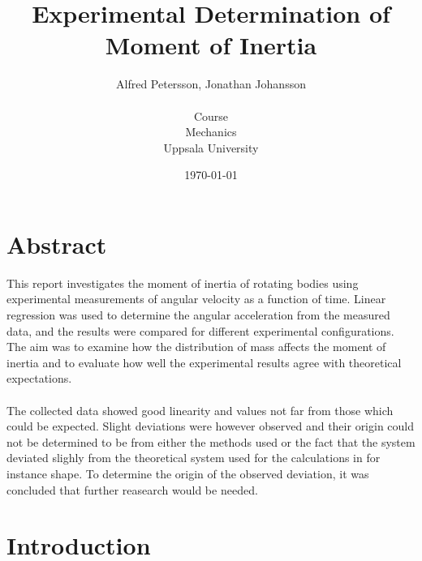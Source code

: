 \documentclass[11pt]{article}
\title{\textbf{Experimental Determination of Moment of Inertia}}
\author{Alfred Petersson, Jonathan Johansson \\\\Course\\Mechanics\\ Uppsala University}
\date{\today}
\begin{document}
\maketitle 


\newpage
\tableofcontents
\newpage

\section{Abstract}

This report investigates the moment of inertia of rotating bodies using experimental measurements of angular velocity as a function of time. 
Linear regression was used to determine the angular acceleration from the measured data, 
and the results were compared for different experimental configurations. 
The aim was to examine how the distribution of mass affects the moment of inertia and to evaluate how well the experimental results agree with theoretical expectations.
\\\\
The collected data showed good linearity and values not far from those which could be expected.
Slight deviations were however observed and their origin could not be determined to be from either the methods used
or the fact that the system deviated slighly from the theoretical system used for the calculations in for instance shape. 
To determine the origin of the observed deviation, it was concluded that further reasearch would be needed.

\section{Introduction}
\end{document}
